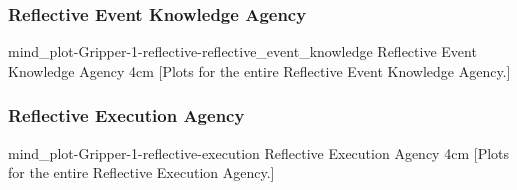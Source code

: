 {\newpage
  \noindent\begin{minipage}{\textwidth}
    \subsubsection{Reflective Event Knowledge Agency}
    \experimentcausegroupplots{\dataappendixmaxtime}
                           {\dataappendixexperimentonemaxtime}
                           {\dataappendixexperimenttwomaxtime}
                           {\dataappendixexperimentthreemaxtime}
                           {\dataappendixexperimentonename}
                           {\dataappendixexperimenttwoname}
                           {\dataappendixexperimentthreename}
                           {\dataappendixexperimentoneprettyname}
                           {\dataappendixexperimenttwoprettyname}
                           \experimentcausegroupplotscontinued{\dataappendixexperimentthreeprettyname}
                                                              {mind_plot-Gripper-1-reflective-reflective_event_knowledge}
                                                              {Reflective Event Knowledge Agency}
                                                              {\experimentdatacommontablereference}
                                                              {4cm}
    \experimentdatablocksworldexample
    [Plots for the entire
      Reflective Event Knowledge Agency.]{}
  \label{figure:mind_plot-Gripper-1-reflective-reflective_event_knowledge}
  \end{minipage}
}
{\newpage
  \noindent\begin{minipage}{\textwidth}
    \subsubsection{Reflective Execution Agency}
    \experimentcausegroupplots{\dataappendixmaxtime}
                           {\dataappendixexperimentonemaxtime}
                           {\dataappendixexperimenttwomaxtime}
                           {\dataappendixexperimentthreemaxtime}
                           {\dataappendixexperimentonename}
                           {\dataappendixexperimenttwoname}
                           {\dataappendixexperimentthreename}
                           {\dataappendixexperimentoneprettyname}
                           {\dataappendixexperimenttwoprettyname}
                           \experimentcausegroupplotscontinued{\dataappendixexperimentthreeprettyname}
                                                              {mind_plot-Gripper-1-reflective-execution}
                                                              {Reflective Execution Agency}
                                                              {\experimentdatacommontablereference}
                                                              {4cm}
    \experimentdatablocksworldexample
    [Plots for the entire
      Reflective Execution Agency.]{}
  \label{figure:mind_plot-Gripper-1-reflective-execution}
  \end{minipage}
}
